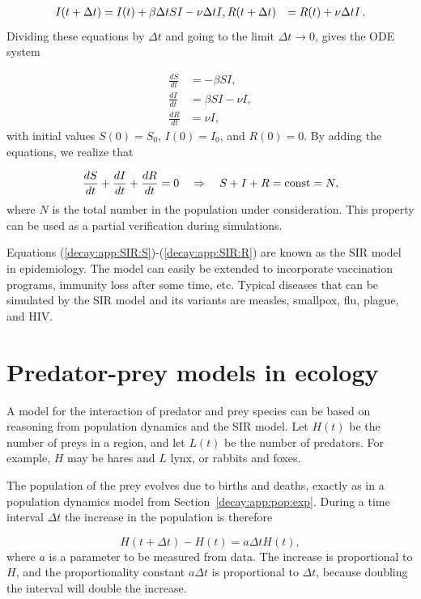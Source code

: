 \documentclass[%
oneside,                 %
final,                   %
10pt]{article}
\begin{document}
\begin{align*}
I(t+\Delta t) &= I(t) + \beta\Delta tSI - \nu\Delta t I,
R(t+\Delta t) &= R(t) + \nu\Delta t I\tp
\end{align*}
Dividing these equations by $\Delta t$ and going to the limit
$\Delta t\rightarrow 0$, gives the ODE system

\begin{align}
\frac{dS}{dt} &= -\beta SI,
\label{decay:app:SIR:S}\\ 
\frac{dI}{dt} &=  \beta SI - \nu I,
\label{decay:app:SIR:I}\\ 
\frac{dR}{dt} &= \nu I,
\label{decay:app:SIR:R}
\end{align}
with initial values $S(0)=S_0$, $I(0)=I_0$, and $R(0)=0$.
By adding the equations, we realize that

\[ \frac{dS}{dt}+\frac{dI}{dt}+\frac{dR}{dt}=0\quad\Rightarrow\quad
S+I+R=\hbox{const}=N,\]
where $N$ is the total number in the population under consideration.
This property can be used as a partial verification during simulations.

Equations (\ref{decay:app:SIR:S})-(\ref{decay:app:SIR:R}) are known as
the SIR model in epidemiology. The model can easily be extended to
incorporate vaccination programs, immunity loss after some time, etc.
Typical diseases that can be simulated by the SIR model and its variants
are measles, smallpox, flu, plague, and HIV.

\section{Predator-prey models in ecology}
\label{decay:app:predprey}


A model for the interaction of predator and prey species can be based
on reasoning from population dynamics and the SIR model.
Let $H(t)$ be the number of preys in a region, and let $L(t)$
be the number of predators. For example, $H$ may be hares and $L$ lynx,
or rabbits and foxes.

The population of the prey evolves due to births and deaths, exactly
as in a population dynamics model from Section~\ref{decay:app:pop:exp}.
During a time interval $\Delta t$ the increase in the population is
therefore

\[ H(t+\Delta t) - H(t) =  a\Delta t H(t),\]
where $a$ is a parameter to be measured from data.
The increase is proportional to $H$, and the proportionality constant
$a\Delta t$ is proportional to $\Delta t$, because doubling the
interval will double the increase.
\end{document}
